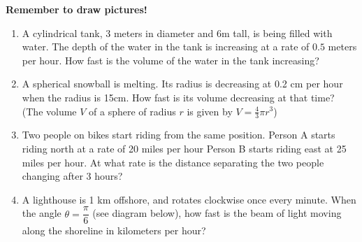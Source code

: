 \documentclass[11pt]{article}
\begin{document}
\drawtitle

\noindent \textbf{Remember to draw pictures!}

\begin{enumerate}
\item A cylindrical tank, 3 meters in diameter and 6m tall, is being
  filled with water.  The depth of the water in the tank is increasing
  at a rate of $0.5$ meters per hour.  How fast is the volume of the
  water in the tank increasing?

  \newpage

\item A spherical snowball is melting. Its radius is decreasing at 0.2
  cm per hour when the radius is 15cm. How fast is its volume
  decreasing at that time? (The volume $V$ of a sphere of radius $r$ is given by $V=\frac{4}{3}\pi r^3$)

  \newpage

\item Two people on bikes start riding from the same position.  Person
  A starts riding north at a rate of 20 miles per hour Person B starts
  riding east at 25 miles per hour.  At what rate is the distance
  separating the two people changing after 3 hours?
  

  \newpage

\item A lighthouse is 1 km offshore, and rotates clockwise once every
  minute.  When the angle $\theta=\dfrac{\pi}{6}$ (see diagram below),
  how fast is the beam of light moving along the shoreline in
  kilometers per hour?
  \begin{center}
  \end{center}

\end{enumerate}
\end{document}
